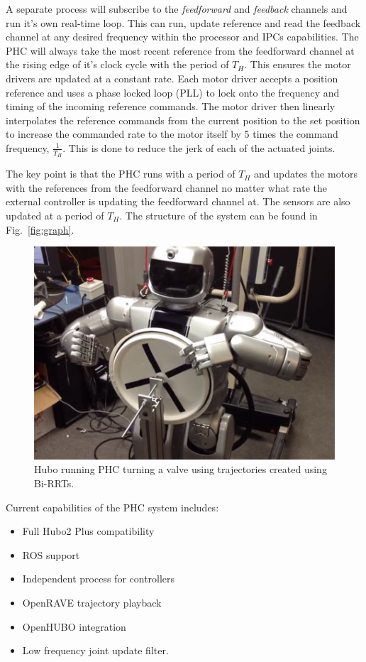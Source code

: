 A separate process will subscribe to the \textit{feedforward} and \textit{feedback} channels and run it's own real-time loop.  
This can run, update reference and read the feedback channel at any desired frequency within the processor and IPCs capabilities.
The PHC will always take the most recent reference from the feedforward channel at the rising edge of it's clock cycle with the period of $T_H$.
This ensures the motor drivers are updated at a constant rate. 
Each motor driver accepts a position reference and uses a phase locked loop (PLL) to lock onto the frequency and timing of the incoming reference commands.
The motor driver then linearly interpolates the reference commands from the current position to the set position to increase the commanded rate to the motor itself by 5 times the command frequency, $\frac{1}{T_H}$.
This is done to reduce the jerk of each of the actuated joints.

The key point is that the PHC runs with a period of $T_H$ and updates the motors with the references from the feedforward channel no matter what rate the external controller is updating the feedforward channel at.  
The sensors are also updated at a period of $T_H$.
The structure of the system can be found in Fig.~\ref{fig:graph}.

\begin{figure}[thpb]
  \centering
\includegraphics[width=1.0\columnwidth]{./pix/hubo_valve.png}
  \caption{Hubo running PHC turning a valve using trajectories created using Bi-RRTs. }
  \label{fig:valve}
\end{figure}

Current capabilities of the PHC system includes:

\begin{itemize}
\item Full Hubo2 Plus compatibility 
\item ROS support
\item Independent process for controllers
\item OpenRAVE trajectory playback
\item OpenHUBO integration 
\item Low frequency joint update filter.
\end{itemize}




